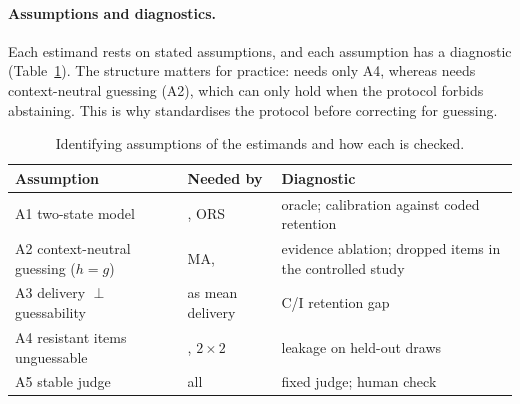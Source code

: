 \paragraph{Assumptions and diagnostics.} Each estimand rests on stated assumptions, and each assumption has a diagnostic
(Table~\ref{tab:assumptions}). The structure matters for practice: \cpr{} needs only A4, whereas \pcs{} needs
context-neutral guessing (A2), which can only hold when the protocol forbids abstaining. This is why \pcme{}
standardises the protocol before correcting for guessing.

\begin{table}[t]
\centering\small
\begin{tabular}{@{}p{}p{}p{}@{}}
\toprule
Assumption & Needed by & Diagnostic \\
\midrule
A1 two-state model & \pcs{}, ORS & oracle; calibration against coded retention \\
A2 context-neutral guessing ($h=g$) & MA, \pcs{} & evidence ablation; dropped items in the controlled study \\
A3 delivery $\perp$ guessability & \pcs{} as mean delivery & C/I retention gap \\
A4 resistant items unguessable & \cpr{}, $2\times2$ & leakage on held-out draws \\
A5 stable judge & all & fixed judge; human check \\
\bottomrule
\end{tabular}
\caption{Identifying assumptions of the \pcme{} estimands and how each is checked.}
\label{tab:assumptions}
\end{table}
